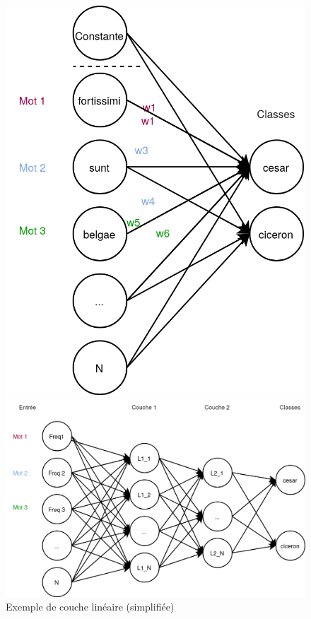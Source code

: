 \begin{figure}[h]
    \centering
    \noindent\begin{minipage}{.35\linewidth}
        \includegraphics[width=\linewidth]{results/deep-learning/explanations/SimpleLinear.png}
        \caption{Exemple de couche linéaire (simplifiée)}
        \label{fig:deep-learning:simple-linear}
    \end{minipage}%
    \hspace{0.04\linewidth}
    \noindent\begin{minipage}{.60\linewidth}
        \includegraphics[width=\linewidth]{results/deep-learning/explanations/MLP.png}

\end{minipage}
\end{figure}
